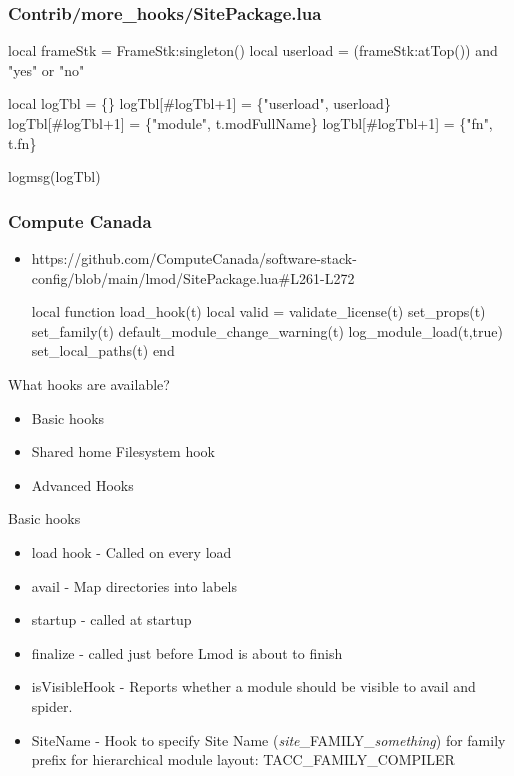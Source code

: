 \documentclass{beamer}
\begin{document}
\begin{frame}[fragile]
  \frametitle{Contrib/more\_hooks/SitePackage.lua}
    {\small
\begin{semiverbatim}
  local frameStk = FrameStk:singleton()
  local userload = (frameStk:atTop()) and
                   "yes" or "no"

  local logTbl       = \{\}
  logTbl[\#logTbl+1]  = \{"userload", userload\}
  logTbl[\#logTbl+1]  = \{"module", t.modFullName\}
  logTbl[\#logTbl+1]  = \{"fn", t.fn\}

  logmsg(logTbl)
\end{semiverbatim}
    }
\end{frame}

\begin{frame}[fragile]
  \frametitle{Compute Canada}
  \begin{itemize}
    \item https://github.com/ComputeCanada/software-stack-config/blob/main/lmod/SitePackage.lua\#L261-L272
    {\small
\begin{semiverbatim}
     local function load\_hook(t)
        local valid = validate\_license(t)
        set\_props(t)
        set\_family(t)
        default\_module\_change\_warning(t)
        log\_module\_load(t,true)
        set\_local\_paths(t)
     end
\end{semiverbatim}
    }
    \end{itemize}
\end{frame}

\begin{frame}{What hooks are available?}
  \begin{itemize}
    \item Basic hooks
    \item Shared home Filesystem hook
    \item Advanced Hooks
  \end{itemize}
\end{frame}

\begin{frame}{Basic hooks}
  \begin{itemize}
    \item load hook - Called on every load
    \item avail - Map directories into labels
    \item startup - called at startup
    \item finalize - called just before Lmod is about to finish
    \item isVisibleHook - Reports whether a module should be visible
      to avail and spider.
    \item SiteName - Hook to specify Site Name
      (\emph{site}\_FAMILY\_\emph{something}) for family prefix for
      hierarchical module layout: TACC\_FAMILY\_COMPILER
  \end{itemize}
\end{frame}
\end{document}

